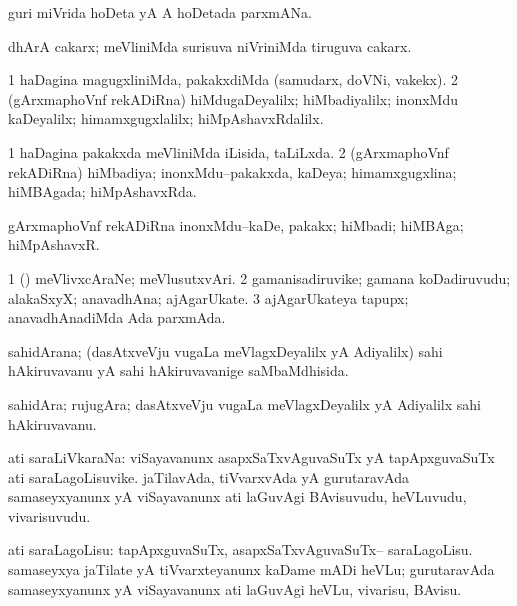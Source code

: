\bentry
{}
\gl{\nA}
\bmng
guri miVrida hoDeta yA A hoDetada parxmANa. 
\emng
\eentry

\bentry
{}
\gl{\nA}
\bmng
dhArA cakarx; meVliniMda surisuva niVriniMda tiruguva cakarx.  
\emng
\eentry

\bentry
{}
\gl{\kirxvi}
\bmng
\bnum
\num{1} haDagina magugxliniMda, pakakxdiMda (samudarx, doVNi, \mo vakekx). 
\num{2} (gArxmaphoVnf rekADiRna) hiMdugaDeyalilx; hiMbadiyalilx; inonxMdu kaDeyalilx; himamxgugxlalilx; hiMpAshavxRdalilx. 
\enum
\emng
\eentry


\bentry
{}
\gl{\gu}
\bmng
\bnum
\num{1} haDagina pakakxda meVliniMda iLisida, taLiLxda. 
\num{2} (gArxmaphoVnf rekADiRna) hiMbadiya; inonxMdu--pakakxda, kaDeya; himamxgugxlina; hiMBAgada; hiMpAshavxRda. 
\enum
\emng
\eentry


\bentry
{}
\gl{\nA}
\bmng
gArxmaphoVnf rekADiRna inonxMdu--kaDe, pakakx; hiMbadi; hiMBAga; hiMpAshavxR. 
\emng
\eentry


\bentry
{}
\gl{\nA}
\bmng
\bnum
\num{1} (\viparx) meVlivxcAraNe; meVlusutxvAri. 
\num{2} gamanisadiruvike; gamana koDadiruvudu; alakaSxyX; anavadhAna; ajAgarUkate. 
\num{3} ajAgarUkateya tapupx; anavadhAnadiMda Ada parxmAda. 
\enum
\emng
\eentry


\bentry
{}
\gl{\gu}
\bmng
sahidArana; (dasAtxveVju \mo vugaLa meVlagxDeyalilx yA Adiyalilx) sahi hAkiruvavanu yA sahi hAkiruvavanige saMbaMdhisida. 
\emng
\eentry


\bentry
{}
\gl{\nA}
\bmng
sahidAra; rujugAra; dasAtxveVju \mo vugaLa meVlagxDeyalilx yA Adiyalilx sahi hAkiruvavanu. 
\emng
\eentry


\bentry
{}
\gl{\nA}
\bmng
ati saraLiVkaraNa: 
\banum
{} viSayavanunx asapxSaTxvAguvaSuTx yA tapApxguvaSuTx ati saraLagoLisuvike. 
 jaTilavAda, tiVvarxvAda yA gurutaravAda samaseyxyanunx yA viSayavanunx ati laGuvAgi BAvisuvudu, heVLuvudu, vivarisuvudu. 
\eanum
\emng
\eentry


\bentry
{}
\gl{\sakirx}
\bmng
ati saraLagoLisu: 
\banum
{} tapApxguvaSuTx, asapxSaTxvAguvaSuTx-- saraLagoLisu. 
 samaseyxya jaTilate yA tiVvarxteyanunx kaDame mADi heVLu; gurutaravAda samaseyxyanunx yA viSayavanunx ati laGuvAgi heVLu, vivarisu, BAvisu. 
\eanum
\emng
\eentry


